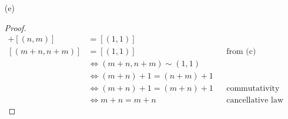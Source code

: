 \documentclass[13pt]{article}
\begin{document}
\begin{enumerate}
\item [(e)]
  \begin{proof}
    \begin{align*}
      [(m, n)] + [(n, m)] &= [(1, 1)] \\
      [(m + n, n + m)] &= [(1, 1)] && \text{from (c)} \\
                          &\iff (m + n, n + m) \sim (1, 1) \\
                          &\iff (m + n) + 1 = (n + m) + 1 \\
                          &\iff (m + n) + 1 = (m + n) + 1 && \text{commutativity and associativity of addition} \\
                          &\iff m + n = m + n && \text{cancellative law}
    \end{align*}
  \end{proof}
\end{enumerate}
\end{document}

